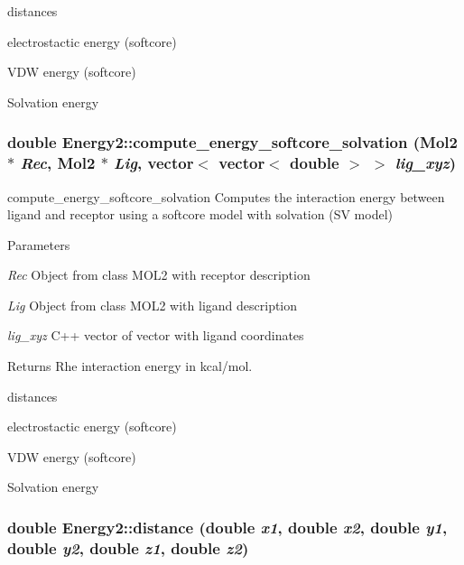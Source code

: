 distances

electrostactic energy (softcore)

VDW energy (softcore)

Solvation energy \hypertarget{classEnergy2_af89f6892acb0a6db0da0b8e941edbed4}{
\subsubsection[{compute\_\-energy\_\-softcore\_\-solvation}]{\setlength{\rightskip}{0pt plus 5cm}double Energy2::compute\_\-energy\_\-softcore\_\-solvation ({\bf Mol2} $\ast$ {\em Rec}, \/  {\bf Mol2} $\ast$ {\em Lig}, \/  vector$<$ vector$<$ double $>$ $>$ {\em lig\_\-xyz})}}
\label{classEnergy2_af89f6892acb0a6db0da0b8e941edbed4}


compute\_\-energy\_\-softcore\_\-solvation Computes the interaction energy between ligand and receptor using a softcore model with solvation (SV model) 
\begin{DoxyParams}{Parameters}
\item[{\em Rec}]Object from class MOL2 with receptor description \item[{\em Lig}]Object from class MOL2 with ligand description \item[{\em lig\_\-xyz}]C++ vector of vector with ligand coordinates \end{DoxyParams}
\begin{DoxyReturn}{Returns}
Rhe interaction energy in kcal/mol. 
\end{DoxyReturn}


distances

electrostactic energy (softcore)

VDW energy (softcore)

Solvation energy \hypertarget{classEnergy2_a39f28781562359d06bef39ad66f33e85}{
\subsubsection[{distance}]{\setlength{\rightskip}{0pt plus 5cm}double Energy2::distance (double {\em x1}, \/  double {\em x2}, \/  double {\em y1}, \/  double {\em y2}, \/  double {\em z1}, \/  double {\em z2})}}
\label{classEnergy2_a39f28781562359d06bef39ad66f33e85}


